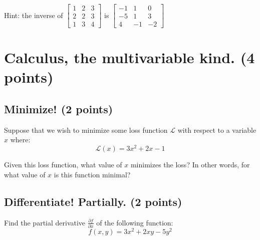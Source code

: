 \documentclass[]{article}
\begin{document}
Hint: the inverse of
    $\begin{bmatrix}
        1 & 2 & 3\\
        2 & 2 & 3\\
        1 & 3 & 4
        \end{bmatrix}$
    is
    $\begin{bmatrix}
        -1 & 1 & 0\\
        -5 & 1 & 3\\
        4 & -1 & -2
        \end{bmatrix}$

\newpage

\section{Calculus, the multivariable kind. (4 points)}
\subsection{Minimize! (2 points)}
Suppose that we wish to minimize some loss function $\mathcal{L}$ with respect to a variable $x$ where:
$$\mathcal{L}(x) = 3x^2 + 2x - 1$$

Given this loss function, what value of $x$ minimizes the loss?  In other words, for what value of $x$ is this function minimal?
\vspace{5cm}

\subsection{Differentiate! Partially.  (2 points)}
Find the partial derivative $\frac{\partial f}{\partial x}$ of the following function:
$$ f(x, y) = 3x^2 + 2xy - 5y^2 $$
\vspace{4cm}
\end{document}
